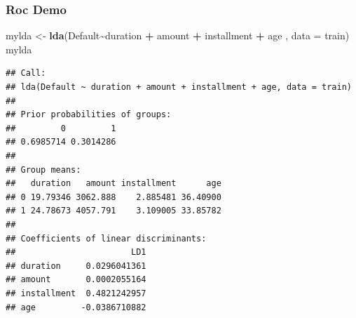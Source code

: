 \documentclass[
  shownotes,
  xcolor={svgnames},
  hyperref={colorlinks,citecolor=DarkBlue,linkcolor=DarkRed,urlcolor=DarkBlue}
  , aspectratio=169]{beamer}
\newenvironment{Shaded}{\begin{snugshade}}{\end{snugshade}}
\newcommand{\DataTypeTok}[1]{\textcolor[rgb]{0.13,0.29,0.53}{#1}}
\newcommand{\KeywordTok}[1]{\textcolor[rgb]{0.13,0.29,0.53}{\textbf{#1}}}
\newcommand{\NormalTok}[1]{#1}
\newcommand{\OperatorTok}[1]{\textcolor[rgb]{0.81,0.36,0.00}{\textbf{#1}}}
\newcommand{\StringTok}[1]{\textcolor[rgb]{0.31,0.60,0.02}{#1}}
\begin{document}
\begin{frame}[fragile]
\frametitle{Roc Demo}

\begin{scriptsize}
\begin{Shaded}
\begin{Highlighting}[]
\NormalTok{mylda \textless{}{-}}\StringTok{ }\KeywordTok{lda}\NormalTok{(Default}\OperatorTok{\textasciitilde{}}\NormalTok{duration }\OperatorTok{+}\StringTok{ }\NormalTok{amount }\OperatorTok{+}\StringTok{ }\NormalTok{installment }\OperatorTok{+}\StringTok{ }\NormalTok{age , }\DataTypeTok{data =}\NormalTok{ train)}
\NormalTok{mylda}
\end{Highlighting}
\end{Shaded}
\end{scriptsize}

\begin{tiny}

\begin{verbatim}
## Call:
## lda(Default ~ duration + amount + installment + age, data = train)
## 
## Prior probabilities of groups:
##         0         1 
## 0.6985714 0.3014286 
## 
## Group means:
##   duration   amount installment      age
## 0 19.79346 3062.888    2.885481 36.40900
## 1 24.78673 4057.791    3.109005 33.85782
## 
## Coefficients of linear discriminants:
##                       LD1
## duration     0.0296041361
## amount       0.0002055164
## installment  0.4821242957
## age         -0.0386710882
\end{verbatim}
\end{tiny}

\end{frame}
\end{document}
